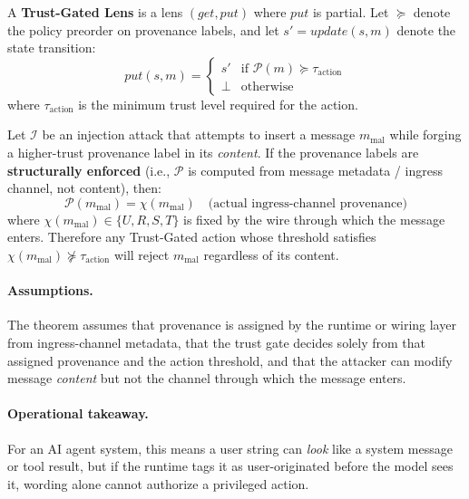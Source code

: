 \begin{itemize}[leftmargin=*]
A \textbf{Trust-Gated Lens} is a lens $(get, put)$ where $put$ is partial. Let $\succeq$ denote the policy preorder on provenance labels, and let $s' = update(s, m)$ denote the state transition:
\begin{equation}
put(s, m) =
\begin{cases}
s' & \text{if } \mathcal{P}(m) \succeq \tau_{\text{action}} \\
\bot & \text{otherwise}
\end{cases}
\label{eq:trust-gated-lens}
\end{equation}
where $\tau_{\text{action}}$ is the minimum trust level required for the action.
\end{itemize}

\begin{theorem}\label{thm:injection-resistance}
Let $\mathcal{I}$ be an injection attack that attempts to insert a message $m_{\text{mal}}$ while forging a higher-trust provenance label in its \emph{content}. If the provenance labels are \textbf{structurally enforced} (i.e., $\mathcal{P}$ is computed from message metadata / ingress channel, not content), then:
\[
\mathcal{P}(m_{\text{mal}}) = \chi(m_{\text{mal}}) \quad \text{(actual ingress-channel provenance)}
\]
where $\chi(m_{\text{mal}}) \in \{U, R, S, T\}$ is fixed by the wire through which the message enters. Therefore any Trust-Gated action whose threshold satisfies $\chi(m_{\text{mal}}) \nsucceq \tau_{\text{action}}$ will reject $m_{\text{mal}}$ regardless of its content.
\end{theorem}

\paragraph{Assumptions.}
The theorem assumes that provenance is assigned by the runtime or wiring layer from ingress-channel metadata, that the trust gate decides solely from that assigned provenance and the action threshold, and that the attacker can modify message \emph{content} but not the channel through which the message enters.

\paragraph{Operational takeaway.}
For an AI agent system, this means a user string can \emph{look} like a system message or tool result, but if the runtime tags it as user-originated before the model sees it, wording alone cannot authorize a privileged action.

